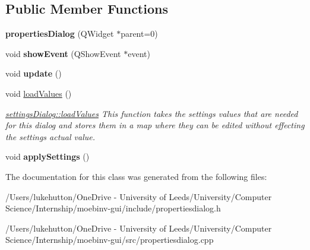 \subsection*{Public Member Functions}
\begin{DoxyCompactItemize}
\item 
\mbox{\label{classproperties_dialog_a23e5c7a841b8f1bda7adcc7d99d4da67}} 
{\bfseries properties\+Dialog} (Q\+Widget $\ast$parent=0)
\item 
\mbox{\label{classproperties_dialog_a41e3286b47651d4c757bb12d34660fe6}} 
void {\bfseries show\+Event} (Q\+Show\+Event $\ast$event)
\item 
\mbox{\label{classproperties_dialog_aff17b502153d16b8f19fe75bf1d06d73}} 
void {\bfseries update} ()
\item 
\mbox{\label{classproperties_dialog_ab3bdbb660ecd5514aea005e0dd59ebb5}} 
void \mbox{\hyperlink{classproperties_dialog_ab3bdbb660ecd5514aea005e0dd59ebb5}{load\+Values}} ()
\begin{DoxyCompactList}\small\item\em \mbox{\hyperlink{classsettings_dialog_a982beae131fefc2788432b192ec343c7}{settings\+Dialog\+::load\+Values}} This function takes the settings values that are needed for this dialog and stores them in a map where they can be edited without effecting the settings actual value. \end{DoxyCompactList}\item 
\mbox{\label{classproperties_dialog_ab8898b89cfa3b9a310b52fbd9003dbc2}} 
void {\bfseries apply\+Settings} ()
\end{DoxyCompactItemize}


The documentation for this class was generated from the following files\+:\begin{DoxyCompactItemize}
\item 
/\+Users/lukehutton/\+One\+Drive -\/ University of Leeds/\+University/\+Computer Science/\+Internship/moebinv-\/gui/include/propertiesdialog.\+h\item 
/\+Users/lukehutton/\+One\+Drive -\/ University of Leeds/\+University/\+Computer Science/\+Internship/moebinv-\/gui/src/propertiesdialog.\+cpp\end{DoxyCompactItemize}
